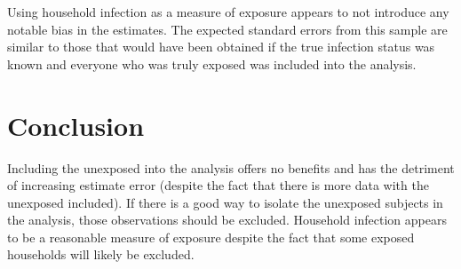 \documentclass[
]{article}
\begin{document}
Using household infection as a measure of exposure appears to not introduce any notable bias in the estimates. The expected standard errors from this sample are similar to those that would have been obtained if the true infection status was known and everyone who was truly exposed was included into the analysis.

\hypertarget{conclusion}{%
\section{Conclusion}\label{conclusion}}

Including the unexposed into the analysis offers no benefits and has the detriment of increasing estimate error (despite the fact that there is more data with the unexposed included). If there is a good way to isolate the unexposed subjects in the analysis, those observations should be excluded. Household infection appears to be a reasonable measure of exposure despite the fact that some exposed households will likely be excluded.
\end{document}
